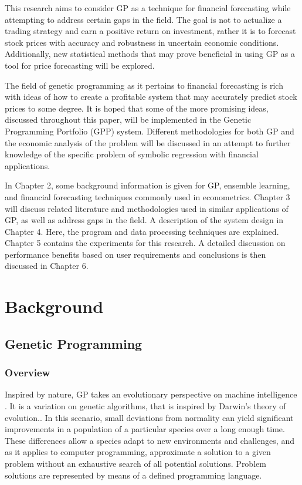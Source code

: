 \documentclass[12pt, letterpaper]{article}
\begin{document}
\textrm{ \indent This research aims to consider GP as a technique for financial forecasting while attempting to address certain gaps in the field. The goal is not to actualize a trading strategy and earn a positive return on investment, rather it is to forecast stock prices with accuracy and robustness in uncertain economic conditions. Additionally, new statistical methods that may prove beneficial in using GP as a tool for price forecasting will be explored. }

\textrm{ \indent The field of genetic programming as it pertains to financial forecasting is rich with ideas of how to create a profitable system that may accurately predict stock prices to some degree. It is hoped that some of the more promising ideas, discussed throughout this paper, will be implemented in the Genetic Programming Portfolio (GPP) system. Different methodologies for both GP and the economic analysis of the problem will be discussed in an attempt to further knowledge of the specific problem of symbolic regression with financial applications. }

\textrm{ \indent In Chapter 2, some background information is given for GP, ensemble learning, and financial forecasting techniques commonly used in econometrics. Chapter 3 will discuss related literature and methodologies used in similar applications of GP, as well as address gaps in the field. A description of the system design in Chapter 4. Here, the program and data processing techniques are explained. Chapter 5 contains the experiments for this research. A detailed discussion on performance benefits based on user requirements and conclusions is then discussed in Chapter 6. }




\newpage 
\section{Background}

\subsection{Genetic Programming}

\subsubsection{Overview}
\textrm{ \indent Inspired by nature, GP takes an evolutionary perspective on machine intelligence \cite{fieldguide} \cite{koza1992}. It is a variation on genetic algorithms, that is inspired by Darwin's theory of evolution.. In this scenario, small deviations from normality can yield significant improvements in a population of a particular species over a long enough time. These differences allow a species adapt to new environments and challenges, and as it applies to computer programming, approximate a solution to a given problem without an exhaustive search of all potential solutions. Problem solutions are represented by means of a defined programming language. }
\end{document}
